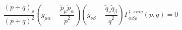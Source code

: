 \begin{equation} 
\frac{(p+q)_{\rho}}{(p+q)^2}(g_{\mu \alpha}- \frac{\tilde{p}_{\mu} 
 \tilde{p}_{\alpha}}{\tilde{p}^2})(g_{\nu \beta}- \frac{\tilde{q}_{\nu} 
 \tilde{q}_{\beta}}{\tilde{q}^2}) \Gamma^{1, 
 sing}_{\alpha \beta \rho}(p,q)=0
\label{24a} 
 \end{equation} 
